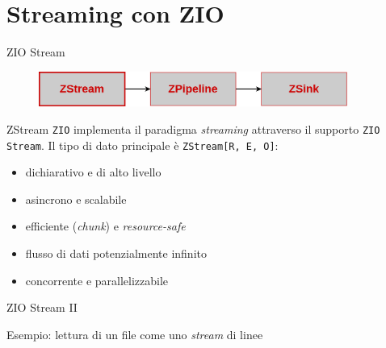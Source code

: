\section{Streaming con ZIO}
\begin{frame}{ZIO Stream}
  \begin{figure}
    \centering
    \includegraphics[width=0.9\textwidth]{img/zio-stream.png}
    \label{ZIO logo.}
  \end{figure}
  \begin{block}{ZStream}
    \texttt{ZIO} implementa il paradigma \textit{streaming} attraverso il supporto \texttt{ZIO Stream}. Il tipo di dato principale è \texttt{ZStream[R, E, O]}:
    \begin{itemize}
      \item dichiarativo e di alto livello
      \item asincrono e scalabile
      \item efficiente (\textit{chunk}) e \textit{resource-safe}
      \item flusso di dati potenzialmente infinito
      \item concorrente e parallelizzabile
    \end{itemize}
  \end{block}
\end{frame}

\begin{frame}{ZIO Stream II}
    \begin{block}{Esempio: lettura di un file come uno \textit{stream} di linee}
        
  \end{block}
\end{frame}